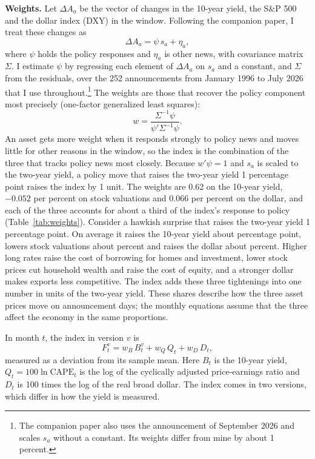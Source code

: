 \documentclass[11pt]{article}
\begin{document}
\textbf{Weights.} Let $\Delta A_a$ be the vector of changes in the 10-year yield, the S\&P 500 and the dollar index (DXY) in the window. Following the companion paper, I treat these changes as
\begin{equation}
\Delta A_a = \psi\, s_a + \eta_a, \label{eq:window}
\end{equation}
where $\psi$ holds the policy responses and $\eta_a$ is other news, with covariance matrix $\Sigma$. I estimate $\psi$ by regressing each element of $\Delta A_a$ on $s_a$ and a constant, and $\Sigma$ from the residuals, over the 252 announcements from January 1996 to July 2026 that I use throughout.\footnote{The companion paper also uses the announcement of September 2026 and scales $s_a$ without a constant. Its weights differ from mine by about 1 percent.} The weights are those that recover the policy component most precisely (one-factor generalized least squares):
\begin{equation}
w = \frac{\Sigma^{-1}\psi}{\psi'\Sigma^{-1}\psi}. \label{eq:weights}
\end{equation}
An asset gets more weight when it responds strongly to policy news and moves little for other reasons in the window, so the index is the combination of the three that tracks policy news most closely. Because $w'\psi=1$ and $s_a$ is scaled to the two-year yield, a policy move that raises the two-year yield 1 percentage point raises the index by 1 unit. The weights are 0.62 on the 10-year yield, $-0.052$ per percent on stock valuations and 0.066 per percent on the dollar, and each of the three accounts for about a third of the index's response to policy (Table~\ref{tab:weights}). Consider a hawkish surprise that raises the two-year yield 1 percentage point. On average it raises the 10-year yield about  percentage point, lowers stock valuations about  percent and raises the dollar about  percent. Higher long rates raise the cost of borrowing for homes and investment, lower stock prices cut household wealth and raise the cost of equity, and a stronger dollar makes exports less competitive. The index adds these three tightenings into one number in units of the two-year yield. These shares describe how the three asset prices move on announcement days; the monthly equations assume that the three affect the economy in the same proportions.



In month $t$, the index in version $v$ is
\begin{equation}
F_t^{v} = w_B\, B_t^{v} + w_Q\, Q_t + w_D\, D_t, \label{eq:fci}
\end{equation}
measured as a deviation from its sample mean. Here $B_t$ is the 10-year yield, $Q_t=100\ln\text{CAPE}_t$ is the log of the cyclically adjusted price-earnings ratio and $D_t$ is 100 times the log of the real broad dollar. The index comes in two versions, which differ in how the yield is measured.
\end{document}
